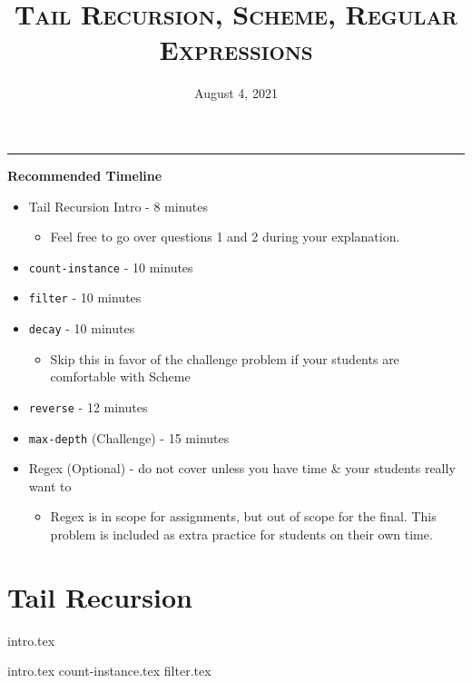 \documentclass{exam}
\title{\textsc{Tail Recursion, Scheme, Regular Expressions}}
\date{August 4, 2021}
\begin{document}
\maketitle
\rule{\textwidth}{0.15em}
\fontsize{12}{15}\selectfont

\begin{guide}
\begin{blocksection}
    \textbf{Recommended Timeline}
    \begin{itemize}
        \item Tail Recursion Intro - 8 minutes
        \begin{itemize}
            \item Feel free to go over questions 1 and 2 during your explanation.
        \end{itemize}
        \item \lstinline{count-instance} - 10 minutes
        \item \lstinline{filter} - 10 minutes
        \item \lstinline{decay} - 10 minutes
        \begin{itemize}
            \item Skip this in favor of the challenge problem if your students are comfortable with Scheme
        \end{itemize}
        \item \lstinline{reverse} - 12 minutes
        \item \lstinline{max-depth} (Challenge) - 15 minutes
        \item Regex (Optional) - do not cover unless you have time \& your students really want to
        \begin{itemize}
            \item Regex is in scope for assignments, but out of scope for the final. This problem is included as extra practice for students on their own time.
        \end{itemize}
    \end{itemize}
\end{blocksection}
\newpage
\end{guide}

\section{Tail Recursion}
{intro.tex}
\begin{questions}
{intro.tex}
\newpage
{count-instance.tex}
{filter.tex}
\end{questions}
\end{document}
